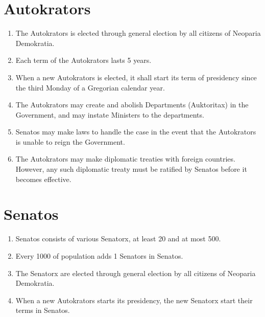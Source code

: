 \section{Autokrators}
\begin{enumerate}[start=201]
	\item The Autokrators is elected through general election by all citizens of Neoparia Demokratia.
	\item Each term of the Autokrators lasts 5 years.
	\item When a new Autokrators is elected, it shall start its term of presidency since the third Monday of a Gregorian calendar year.
	\item The Autokrators may create and abolish Departments (Auktoritax) in the Government, and may instate Ministers to the departments.
	\item Senatos may make laws to handle the case in the event that the Autokrators is unable to reign the Government.
	\item The Autokrators may make diplomatic treaties with foreign countries.
	      However, any such diplomatic treaty must be ratified by Senatos before it becomes effective.
\end{enumerate}

\section{Senatos}
\begin{enumerate}[start=301]
	\item Senatos consists of various Senatorx, at least 20 and at most 500.
	\item Every 1000 of population adds 1 Senators in Senatos.
	\item The Senatorx are elected through general election by all citizens of Neoparia Demokratia.
	\item When a new Autokrators starts its presidency, the new Senatorx start their terms in Senatos.
\end{enumerate}








